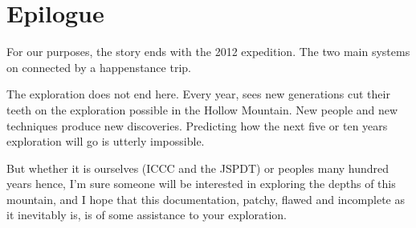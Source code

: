 \chapter{Epilogue}

For our purposes, the story ends with the 2012 expedition. The two main systems on  connected by a happenstance trip.

The exploration does not end here. Every year,  sees new generations cut their teeth on the exploration possible in the Hollow Mountain. New people and new techniques produce new discoveries. Predicting how the next five or ten years exploration will go is utterly impossible.

But whether it is ourselves (ICCC and the JSPDT) or peoples many hundred years hence, I'm sure someone will be interested in exploring the depths of this mountain, and I hope that this documentation, patchy, flawed and incomplete as it inevitably is, is of some assistance to your exploration.


